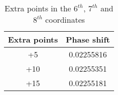 \documentclass[Dissertation.tex]{subfiles}
\begin{document}
\begin{table}[H]
\centering
\begin{tabular}{c c}
\toprule
Extra points & Phase shift \\
\midrule
+5 & 0.02255816 \\
+10 & 0.02255351 \\
+15 & 0.02255181 \\
\bottomrule
\end{tabular}
\caption{Extra points in the $6^{th}$, $7^{th}$ and $8^{th}$ coordinates}
\label{tab:678thcoordExtraPoints}
\end{table}



\biblio
\end{document}
